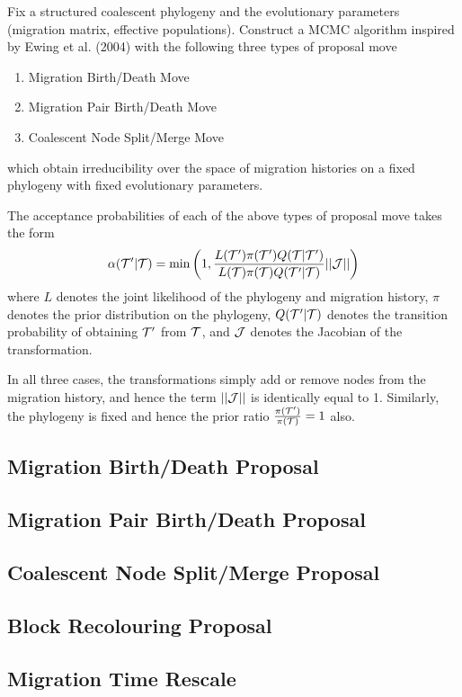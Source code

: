 Fix a structured coalescent phylogeny and the evolutionary parameters (migration matrix, effective populations). Construct a MCMC algorithm inspired by Ewing et al. (2004) with the following three types of proposal move
	\begin{enumerate}
		\item Migration Birth/Death Move
		\item Migration Pair Birth/Death Move
		\item Coalescent Node Split/Merge Move
	\end{enumerate}
which obtain irreducibility over the space of migration histories on a fixed phylogeny with fixed evolutionary parameters.

The acceptance probabilities of each of the above types of proposal move takes the form
	\begin{equation}
		\alpha(\mathcal{T}' | \mathcal{T}) = \min \left( 1, \frac{L(\mathcal{T}') \pi(\mathcal{T}') Q(\mathcal{T} | \mathcal{T}')}{L(\mathcal{T}) \pi(\mathcal{T}) Q(\mathcal{T}' | \mathcal{T})} || \mathcal{J} || \right)
	\end{equation}
where $L$ denotes the joint likelihood of the phylogeny and migration history, $\pi$ denotes the prior distribution on the phylogeny, $Q(\mathcal{T}' | \mathcal{T})$ denotes the transition probability of obtaining $\mathcal{T}'$ from $\mathcal{T}$, and $\mathcal{J}$ denotes the Jacobian of the transformation.

In all three cases, the transformations simply add or remove nodes from the migration history, and hence the term $||\mathcal{J}||$ is identically equal to 1. Similarly, the phylogeny is fixed and hence the prior ratio $\frac{\pi(\mathcal{T}')}{\pi(\mathcal{T})} = 1$ also.

\subsection{Migration Birth/Death Proposal}
	
	
\subsection{Migration Pair Birth/Death Proposal}
	
	
\subsection{Coalescent Node Split/Merge Proposal}
	
	
\subsection{Block Recolouring Proposal}
	
	
\subsection{Migration Time Rescale}
	